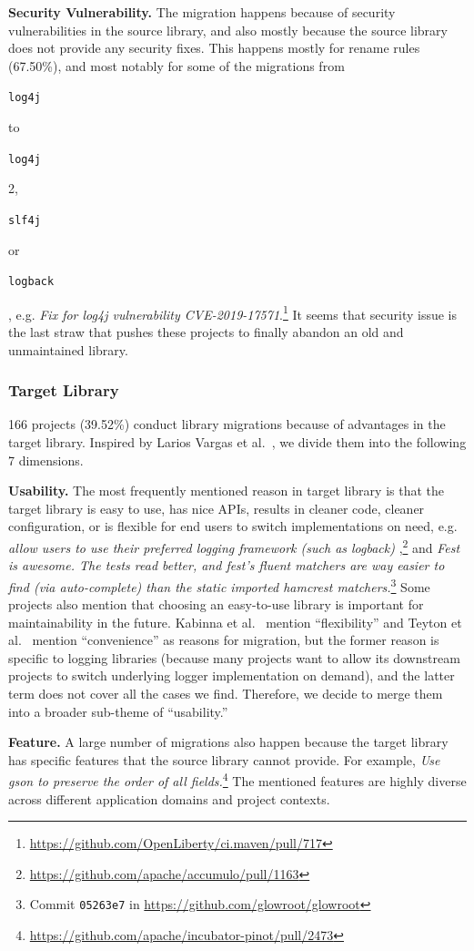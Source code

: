 \documentclass[sigconf, screen]{acmart}
\newcommand{\Code}[1]{\begin{small}\texttt{#1}\end{small}}
\begin{document}
\textbf{Security Vulnerability.}
The migration happens because of security vulnerabilities in the source library, and also mostly because the source library does not provide any security fixes. 
This happens mostly for rename rules (67.50\%), and most notably for some of the migrations from \Code{log4j} to \Code{log4j} 2, \Code{slf4j} or \Code{logback}, e.g. \textit{Fix for log4j vulnerability CVE-2019-17571}.\footnote{\url{https://github.com/OpenLiberty/ci.maven/pull/717}}
It seems that security issue is the last straw that pushes these projects to finally abandon an old and unmaintained library.

\subsubsection{Target Library}
166 projects (39.52\%) conduct library migrations because of advantages in the target library.
Inspired by Larios Vargas et al.~\cite{larios2020selecting}, we divide them into the following 7 dimensions.

\textbf{Usability.} 
The most frequently mentioned reason in target library is that the target library is easy to use, has nice APIs, results in cleaner code, cleaner configuration, or is flexible for end users to switch implementations on need, e.g. \textit{allow users to use their preferred logging framework (such as logback) },\footnote{\url{https://github.com/apache/accumulo/pull/1163}} and \textit{Fest is awesome. The tests read better, and fest's fluent matchers are way easier to find (via auto-complete) than the static imported hamcrest matchers.}\footnote{Commit \texttt{05263e7} in \url{https://github.com/glowroot/glowroot}}
Some projects also mention that choosing an easy-to-use library is important for maintainability in the future.
Kabinna et al.~\cite{kabinna2016logging} mention ``flexibility'' and Teyton et al.~\cite{teyton2012mining} mention ``convenience'' as reasons for migration, but the former reason is specific to logging libraries (because many projects want to allow its downstream projects to switch underlying logger implementation on demand), and the latter term does not cover all the cases we find. 
Therefore, we decide to merge them into a broader sub-theme of ``usability.''

\textbf{Feature.}
A large number of migrations also happen because the target library has specific features that the source library cannot provide. 
For example, \textit{Use gson to preserve the order of all fields.}\footnote{\url{https://github.com/apache/incubator-pinot/pull/2473}}
The mentioned features are highly diverse across different application domains and project contexts. 
\end{document}
